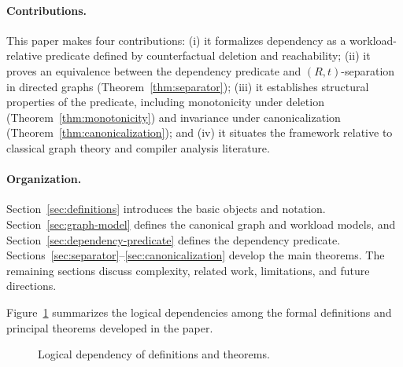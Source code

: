 \documentclass[11pt]{article}
\begin{document}
\paragraph{Contributions.}
This paper makes four contributions: (i) it formalizes dependency as a
workload-relative predicate defined by counterfactual deletion and
reachability; (ii) it proves an equivalence between the dependency
predicate and $(R,t)$-separation in directed graphs (Theorem~\ref{thm:separator});
(iii) it establishes structural properties of the predicate, including
monotonicity under deletion (Theorem~\ref{thm:monotonicity}) and invariance
under canonicalization (Theorem~\ref{thm:canonicalization}); and (iv) it
situates the framework relative to classical graph theory and compiler
analysis literature.

\paragraph{Organization.}
Section~\ref{sec:definitions} introduces the basic objects and notation.
Section~\ref{sec:graph-model} defines the canonical graph and workload models, and
Section~\ref{sec:dependency-predicate} defines the dependency predicate.
Sections~\ref{sec:separator}--\ref{sec:canonicalization} develop the main
theorems. The remaining sections discuss complexity, related work,
limitations, and future directions.

Figure~\ref{fig:theorem-deps} summarizes the logical dependencies among the formal definitions and principal theorems developed in the paper.

\begin{figure}[t]
\centering
{}
\caption{Logical dependency of definitions and theorems.}
\label{fig:theorem-deps}
\end{figure}
\end{document}
